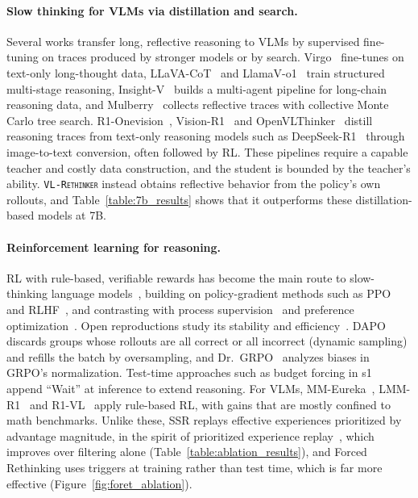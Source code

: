 \documentclass{article}
\newcommand{\model}{\texttt{\textsc{VL-Rethinker}}\xspace}
\begin{document}
\paragraph{Slow thinking for VLMs via distillation and search.} Several works transfer long, reflective reasoning to VLMs by supervised fine-tuning on traces produced by stronger models or by search. Virgo~\cite{virgo} fine-tunes on text-only long-thought data, LLaVA-CoT~\cite{llavacot} and LlamaV-o1~\cite{llamav_o1} train structured multi-stage reasoning, Insight-V~\cite{insight_v} builds a multi-agent pipeline for long-chain reasoning data, and Mulberry~\cite{Mulberry} collects reflective traces with collective Monte Carlo tree search. R1-Onevision~\cite{R1OneVision}, Vision-R1~\cite{vision-r1} and OpenVLThinker~\cite{OpenVLThinker} distill reasoning traces from text-only reasoning models such as DeepSeek-R1~\cite{deepseek-r1} through image-to-text conversion, often followed by RL. These pipelines require a capable teacher and costly data construction, and the student is bounded by the teacher's ability. \model instead obtains reflective behavior from the policy's own rollouts, and Table~\ref{table:7b_results} shows that it outperforms these distillation-based models at 7B.

\paragraph{Reinforcement learning for reasoning.} RL with rule-based, verifiable rewards has become the main route to slow-thinking language models~\cite{deepseek-r1,kimi-1_5,openai-o1}, building on policy-gradient methods such as PPO~\cite{ppo} and RLHF~\cite{instructgpt}, and contrasting with process supervision~\cite{letsverify} and preference optimization~\cite{DPO}. Open reproductions study its stability and efficiency~\cite{simplerl,open-reasoner-zero,deepscaler2025,lightr1}. DAPO~\cite{dapo} discards groups whose rollouts are all correct or all incorrect (dynamic sampling) and refills the batch by oversampling, and Dr.~GRPO~\cite{drgrpo} analyzes biases in GRPO's normalization. Test-time approaches such as budget forcing in s1~\cite{s1} append ``Wait'' at inference to extend reasoning. For VLMs, MM-Eureka~\cite{mmeureka}, LMM-R1~\cite{lmm-r1} and R1-VL~\cite{r1vl} apply rule-based RL, with gains that are mostly confined to math benchmarks. Unlike these, SSR replays effective experiences prioritized by advantage magnitude, in the spirit of prioritized experience replay~\cite{per}, which improves over filtering alone (Table~\ref{table:ablation_results}), and Forced Rethinking uses triggers at training rather than test time, which is far more effective (Figure~\ref{fig:foret_ablation}).
\end{document}
